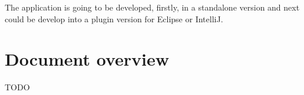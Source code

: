 The application is going to be developed, firstly, in a standalone version and
next could be develop into a plugin version for Eclipse or IntelliJ.

\section{Document overview}
\label{sec:Document overview}

TODO

